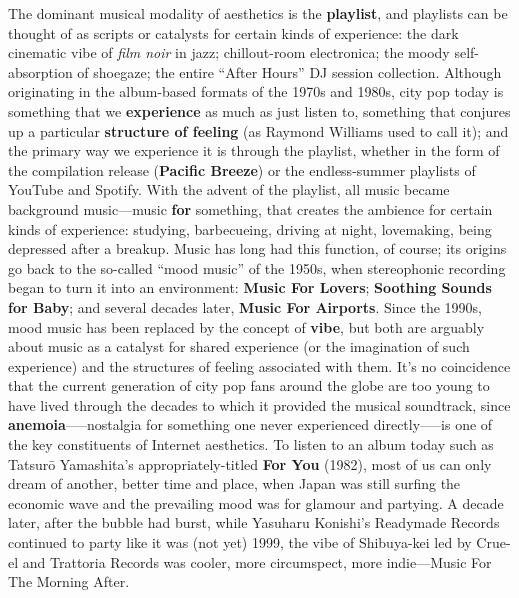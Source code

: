 \documentclass[
  letterpaper,
  DIV=11,
  numbers=noendperiod,
  oneside]{scrartcl}
\begin{document}
The dominant musical modality of aesthetics is the \textbf{playlist},
and playlists can be thought of as scripts or catalysts for certain
kinds of experience: the dark cinematic vibe of \emph{film noir} in
jazz; chillout-room electronica; the moody self-absorption of shoegaze;
the entire ``After Hours'' DJ session collection. Although originating
in the album-based formats of the 1970s and 1980s, city pop today is
something that we \textbf{experience} as much as just listen to,
something that conjures up a particular \textbf{structure of feeling}
(as Raymond Williams used to call it); and the primary way we experience
it is through the playlist, whether in the form of the compilation
release (\textbf{Pacific Breeze}) or the endless-summer playlists of
YouTube and Spotify. With the advent of the playlist, all music became
background music---music \textbf{for} something, that creates the
ambience for certain kinds of experience: studying, barbecueing, driving
at night, lovemaking, being depressed after a breakup. Music has long
had this function, of course; its origins go back to the so-called
``mood music'' of the 1950s, when stereophonic recording began to turn
it into an environment: \textbf{Music For Lovers}; \textbf{Soothing
Sounds for Baby}; and several decades later, \textbf{Music For
Airports}. Since the 1990s, mood music has been replaced by the concept
of \textbf{vibe}, but both are arguably about music as a catalyst for
shared experience (or the imagination of such experience) and the
structures of feeling associated with them. It's no coincidence that the
current generation of city pop fans around the globe are too young to
have lived through the decades to which it provided the musical
soundtrack, since \textbf{anemoia}-----nostalgia for something one never
experienced directly-----is one of the key constituents of Internet
aesthetics. To listen to an album today such as Tatsurō Yamashita's
appropriately-titled \textbf{For You} (1982), most of us can only dream
of another, better time and place, when Japan was still surfing the
economic wave and the prevailing mood was for glamour and partying. A
decade later, after the bubble had burst, while Yasuharu Konishi's
Readymade Records continued to party like it was (not yet) 1999, the
vibe of Shibuya-kei led by Crue-el and Trattoria Records was cooler,
more circumspect, more indie---Music For The Morning After.

\end{document}
